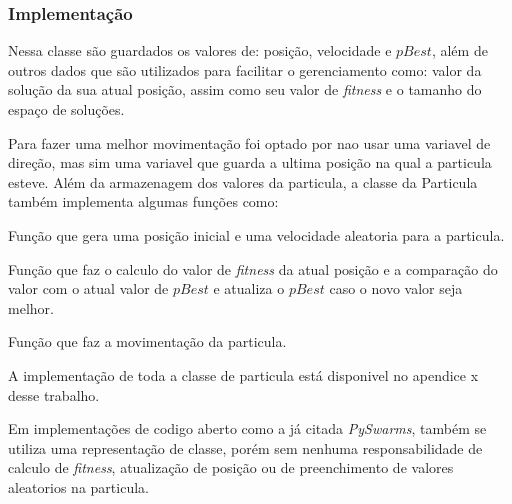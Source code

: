         \subsubsection{Implementação}
            Nessa classe são guardados os valores de: posição, velocidade e $pBest$, além de outros dados que são utilizados para facilitar o gerenciamento como: valor da solução da sua atual posição, assim como seu valor de \textit{fitness} e o tamanho do espaço de soluções. \newline

            Para fazer uma melhor movimentação foi optado por nao usar uma variavel de direção, mas sim uma variavel que guarda a ultima posição na qual a particula esteve.\newline
            Além da armazenagem dos valores da particula, a classe da Particula também implementa algumas funções como:\newline
            
            Função \textbf{} que gera uma posição inicial e uma velocidade aleatoria para a particula.\newline
            
            Função \textbf{} que faz o calculo do valor de \textit{fitness} da atual posição e a comparação do valor com o atual valor de $pBest$ e atualiza o $pBest$ caso o novo valor seja melhor.\newline

            Função \textbf{} que faz a movimentação da particula.\newline
            

            \noindent A implementação de toda a classe de particula está disponivel no apendice x desse trabalho.\newline

            
            
            Em implementações de codigo aberto como a já citada \textit{PySwarms}, também se utiliza uma representação de classe, porém sem nenhuma responsabilidade de calculo de \textit{fitness}, atualização de posição ou de preenchimento de valores aleatorios na particula.\newline


